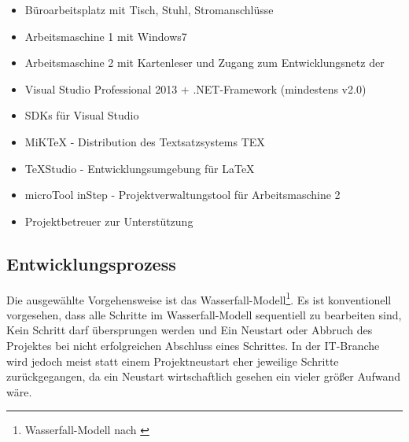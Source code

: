 \begin{itemize}
\renewcommand{\labelitemi}{}
\renewcommand{\labelitemii}{\textbullet}
\renewcommand{\labelitemiii}{\normalfont\bfseries\textendash}
		\begin{itemize}
			\item Büroarbeitsplatz mit Tisch, Stuhl, Stromanschlüsse
			\item Arbeitsmaschine 1 mit Windows7
			\item Arbeitsmaschine 2 mit Kartenleser und Zugang zum Entwicklungsnetz der \DRV
		\end{itemize}
		\begin{itemize}
			\item Visual Studio Professional 2013 + .NET-Framework (mindestens v2.0)
			\item \ac{SDK}s für Visual Studio
			\begin{itemize}
						
			\end{itemize}
			\item MiKTeX - Distribution des Textsatzsystems TEX
			\item TeXStudio - Entwicklungsumgebung für \LaTeX
			\item microTool inStep - Projektverwaltungstool für Arbeitsmaschine 2
		\end{itemize}
	\itemd{Personal}{}
		\begin{itemize}
			\item Projektbetreuer zur Unterstützung
		\end{itemize}
\end{itemize}

\subsection{Entwicklungsprozess}
\label{sec:Entwicklungsprozess}

Die ausgewählte Vorgehensweise ist das Wasserfall-Modell\footnote{Wasserfall-Modell nach \cite{wasserfallRoyce}}. Es ist konventionell vorgesehen, dass alle Schritte im Wasserfall-Modell sequentiell zu bearbeiten sind, \dahe Kein Schritt darf übersprungen werden und Ein Neustart oder Abbruch des Projektes bei nicht erfolgreichen Abschluss eines Schrittes. In der IT-Branche wird jedoch meist statt einem Projektneustart eher jeweilige Schritte zurückgegangen, da ein Neustart wirtschaftlich gesehen ein vieler größer Aufwand wäre.

